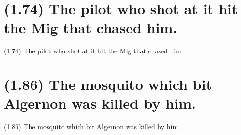 \documentclass{article}
\begin{document}
\clearpage

%
%

\section*{(1.74) The pilot who shot at it hit the Mig that chased him.}

\bigbreak
\begin{enumerate*}
\item[(1.74)] The pilot who shot at it hit the Mig that chased him.
\end{enumerate*}
\bigbreak

\bigbreak
\begin{minipage}{\textwidth}
\end{minipage}
\bigbreak

\clearpage

%
%

\section*{(1.86) The mosquito which bit Algernon was killed by him.}

\bigbreak
\begin{enumerate*}
\item[(1.86)] The mosquito which bit Algernon was killed by him.
\end{enumerate*}
\bigbreak
\end{document}
